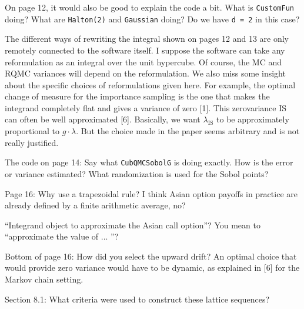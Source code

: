 \documentclass{amsart}
\begin{document}
\vspace{1cm}

On page 12, it would also be good to explain the code a bit. What is \texttt{CustomFun} doing? What are \texttt{Halton(2)} and \texttt{Gaussian} doing? Do we have \texttt{d = 2} in this case?

\vspace{1cm}

The different ways of rewriting the integral shown on pages 12 and 13 are only remotely connected to the software itself. I suppose the software can take any reformulation as an integral over the unit hypercube. Of course, the MC and RQMC variances will depend on the reformulation. We also miss some insight about the specific choices of reformulations given here. For example, the optimal change of measure for the importance sampling is the one that makes the integrand completely flat and gives a variance of zero [1]. This zerovariance IS can often be well approximated [6]. Basically, we want $\lambda_\text{IS}$ to be approximately proportional to $g \cdot \lambda$. But the choice made in the paper seems arbitrary and is not really justified.

The code on page 14: Say what \texttt{CubQMCSobolG} is doing exactly. How is the error or variance estimated? What randomization is used for the Sobol points?

\vspace{1cm}

Page 16: Why use a trapezoidal rule? I think Asian option payoffs in practice are already defined by a finite arithmetic average, no?

\vspace{1cm}

``Integrand object to approximate the Asian call option''? You mean to ``approximate the value of ... ''?

\vspace{1cm}

Bottom of page 16: How did you select the upward drift? An optimal choice that would provide zero variance would have to be dynamic, as explained in [6] for the Markov chain
setting.

\vspace{1cm}

Section 8.1: What criteria were used to construct these lattice sequences?
\end{document}
